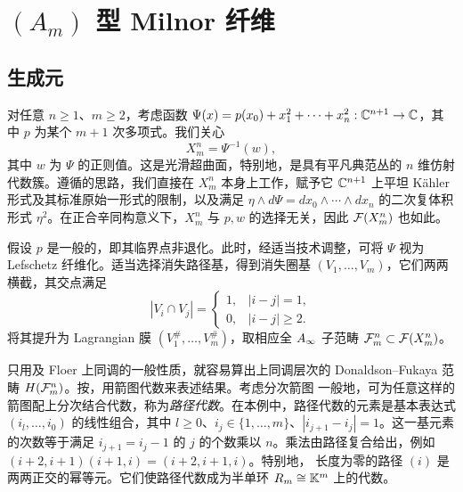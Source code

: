 \section{\texorpdfstring{$(A_m)$}{(Am)} 型 Milnor 纤维}\label{sec:20}\label{section:20}
\subsection{生成元}\label{sec:20a}
对任意 $n\ge1$、$m\ge2$，考虑函数 $\Psi(x)=p(x_0)+x_1^2+\cdots+x_n^2:\mathbb C^{n+1}\to\mathbb C$，其中 $p$ 为某个 $m+1$ 次多项式。我们关心
\[
X_m^n=\Psi^{-1}(w),
\]
其中 $w$ 为 $\Psi$ 的正则值。这是光滑超曲面，特别地，是具有平凡典范丛的 $n$ 维仿射代数簇。遵循的思路，我们直接在 $X_m^n$ 本身上工作，赋予它 $\mathbb C^{n+1}$ 上平坦 Kähler 形式及其标准原始一形式的限制，以及满足 $\eta\wedge d\Psi=dx_0\wedge\cdots\wedge dx_n$ 的二次复体积形式 $\eta^2$。在正合辛同构意义下，$X_m^n$ 与 $p,w$ 的选择无关，因此 $\mathcal F(X_m^n)$ 也如此。

假设 $p$ 是一般的，即其临界点非退化。此时，经适当技术调整，可将 $\Psi$ 视为 Lefschetz 纤维化。适当选择消失路径基，得到消失圈基 $(V_1,\ldots,V_m)$，它们两两横截，其交点满足
\begin{equation}\label{eq:20.1}
|V_i\cap V_j|=\begin{cases}1,&|i-j|=1,\\0,&|i-j|\ge2.\end{cases}
\end{equation}
将其提升为 Lagrangian 膜 $(V_1^\#,\ldots,V_m^\#)$，取相应全 $A_\infty$ 子范畴 $\mathcal F_m^n\subset\mathcal F(X_m^n)$。

只用及 Floer 上同调的一般性质，就容易算出上同调层次的 Donaldson--Fukaya 范畴 $H(\mathcal F_m^n)$。按，用箭图代数来表述结果。考虑分次箭图
一般地，可为任意这样的箭图配上分次结合代数，称为\emph{路径代数}。在本例中，路径代数的元素是基本表达式 $(i_l,\ldots,i_0)$ 的线性组合，其中 $l\ge0$、$i_j\in\{1,\ldots,m\}$、$|i_{j+1}-i_j|=1$。这一基元素的次数等于满足 $i_{j+1}=i_j-1$ 的 $j$ 的个数乘以 $n$。乘法由路径复合给出，例如 $(i+2,i+1)(i+1,i)=(i+2,i+1,i)$。特别地，
长度为零的路径 $(i)$ 是两两正交的幂等元。它们使路径代数成为半单环 $R_m\cong\mathbb K^m$ 上的代数。

